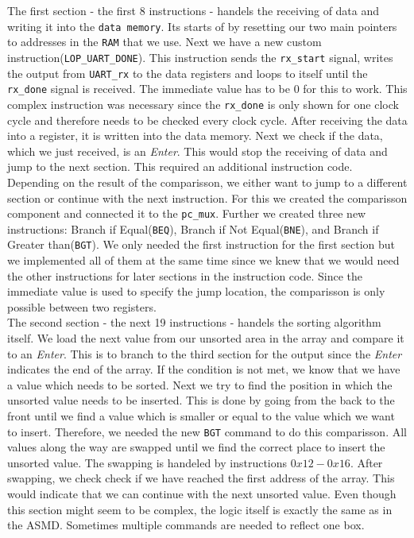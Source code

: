 \documentclass[conference]{IEEEtran}
\begin{document}
The first section - the first 8 instructions - handels the receiving of data and writing it into the \texttt{data memory}. Its starts of by resetting our two main pointers to addresses in the \texttt{RAM} that we use. Next we have a new custom instruction(\texttt{LOP_UART_DONE}). This instruction sends the \texttt{rx\_start} signal, writes the output from \texttt{UART\_rx} to the data registers and loops to itself until the \texttt{rx\_done} signal is received. The immediate value has to be 0 for this to work. This complex instruction was necessary since the \texttt{rx\_done} is only shown for one clock cycle and therefore needs to be checked every clock cycle. After receiving the data into a register, it is written into the data memory. Next we check if the data, which we just received, is an \textit{Enter}. This would stop the receiving of data and jump to the next section. This required an additional instruction code. Depending on the result of the comparisson, we either want to jump to a different section or continue with the next instruction. For this we created the comparisson component and connected it to the \texttt{pc\_mux}. Further we created three new instructions: Branch if Equal(\texttt{BEQ}), Branch if Not Equal(\texttt{BNE}), and Branch if Greater than(\texttt{BGT}). We only needed the first instruction for the first section but we implemented all of them at the same time since we knew that we would need the other instructions for later sections in the instruction code. Since the immediate value is used to specify the jump location, the comparisson is only possible between two registers.\\
The second section - the next 19 instructions - handels the sorting algorithm itself. We load the next value from our unsorted area in the array and compare it to an \textit{Enter}. This is to branch to the third section for the output since the \textit{Enter} indicates the end of the array. If the condition is not met, we know that we have a value which needs to be sorted. Next we try to find the position in which the unsorted value needs to be inserted. This is done by going from the back to the front until we find a value which is smaller or equal to the value which we want to insert. Therefore, we needed the new \texttt{BGT} command to do this comparisson. All values along the way are swapped until we find the correct place to insert the unsorted value. The swapping is handeled by instructions $0x12-0x16$. After swapping, we check check if we have reached the first address of the array. This would indicate that we can continue with the next unsorted value. Even though this section might seem to be complex, the logic itself is exactly the same as in the ASMD. Sometimes multiple commands are needed to reflect one box.\\
\end{document}
